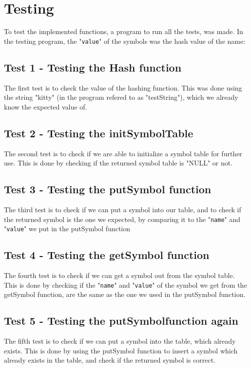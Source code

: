 \documentclass[a4paper,10pt,titlepage]{report}
\begin{document}
\section{Testing}
To test the implemented functions, a program to run all the tests, was made. In the testing program, the "\verb!value!" of the symbols was the hash value of the name:
\subsection{Test 1 - Testing the Hash function}
The first test is to check the value of the hashing function. This was done using the string "kitty" (in the program refered to as "testString"), which we already know the expected value of.

\subsection{Test 2 - Testing the initSymbolTable}
The second test is to check if we are able to initialize a symbol table for further use. This is done by checking if the returned symbol table is "NULL" or not.

\subsection{Test 3 - Testing the putSymbol function}
The third test is to check if we can put a symbol into our table, and to check if the returned symbol is the one we expected, by comparing it to the "\verb!name!" and "\verb!value!" we put in the putSymbol function

\subsection{Test 4 - Testing the getSymbol function}
The fourth test is to check if we can get a symbol out from the symbol table. This is done by checking if the "\verb!name!" and "\verb!value!" of the symbol we get from the getSymbol function, are the same as the one we used in the putSymbol function.

\subsection{Test 5 - Testing the putSymbolfunction again}
The fifth test is to check if we can put a symbol into the table, which already exists. This is done by using the putSymbol function to insert a symbol which already exists in the table, and check if the returned symbol is correct.
\end{document}
